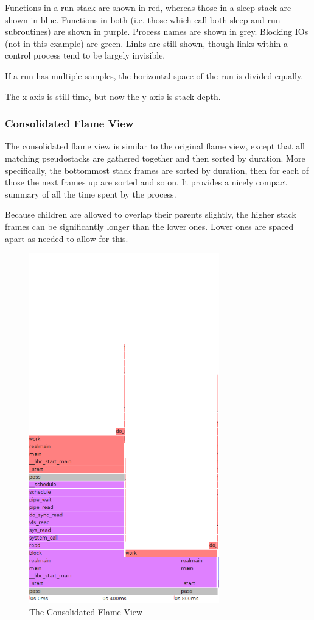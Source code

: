 \documentclass[10pt]{article}
\begin{document}
Functions in a run stack are shown in red, whereas those in a sleep stack are shown in blue.  Functions in both (i.e. those which call both sleep and run subroutines) are shown in purple. Process names are shown in grey.  Blocking IOs (not in this example) are green.  Links are still shown, though links within a control process tend to be largely invisible.

If a run has multiple samples, the horizontal space of the run is divided equally.

The x axis is still time, but now the y axis is stack depth.

\subsubsection{Consolidated Flame View}

The consolidated flame view is similar to the original flame view, except that all matching pseudostacks are gathered together and then sorted by duration.  More specifically, the bottommost stack frames are sorted by duration, then for each of those the next frames up are sorted and so on.  It provides a nicely compact summary of all the time spent by the process.

Because children are allowed to overlap their parents slightly, the higher stack frames can be significantly longer than the lower ones.  Lower ones are spaced apart as needed to allow for this.

\begin{figure}[h]
\includegraphics[width=3.25in]{passcons}
\caption{The Consolidated Flame View}
\end{figure}
\end{document}

